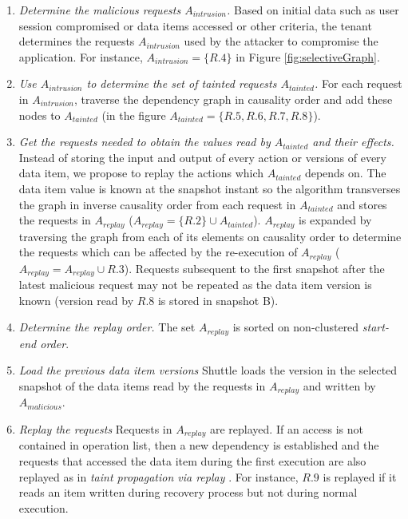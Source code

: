 \begin{enumerate}
\item \textit{Determine the malicious requests $A_{intrusion}$.}
Based on initial data such as user session compromised or data items accessed or other criteria, the tenant determines the requests $A_{intrusion}$ used by the attacker to compromise the application. For instance, $A_{intrusion} = \{R.4\} $ in Figure \ref{fig:selectiveGraph}.

\item \textit{Use $A_{intrusion}$ to determine the set of tainted requests $A_{tainted}$.}
For each request in $A_{intrusion}$, traverse the dependency graph in causality order and add these nodes to $A_{tainted}$ (in the figure $A_{tainted} = \{R.5,R.6,R.7,R.8\}$).


\item \textit{Get the requests needed to obtain the values read by $A_{tainted}$ and their effects.} 
Instead of storing the input and output of every action or versions of every data item, we propose to replay the actions which $A_{tainted}$ depends on. The data item value is known at the snapshot instant so the algorithm transverses the graph in inverse causality order from each request in $A_{tainted}$ and stores the requests in $A_{replay}$ ($A_{replay} = \{R.2\} \cup A_{tainted}$). $A_{replay}$ is expanded by traversing the graph from each of its elements on causality order to determine the requests which can be affected by the re-execution of $A_{replay}$ ($A_{replay} = A_{replay} \cup R.3$). Requests subsequent to the first snapshot after the latest malicious request may not be repeated as the data item version is known (version read by $R.8$ is stored in snapshot B).

\item \textit{Determine the replay order.} 
The set $A_{replay}$ is sorted on non-clustered \emph{start-end order}.

\item \textit{Load the previous data item versions}
Shuttle loads the version in the selected snapshot of the data items read by the requests in $A_{replay}$ and written by $A_{malicious}$.

\item \textit{Replay the requests}
Requests in $A_{replay}$ are replayed. If an access is not contained in operation list, then a new dependency is established and the requests that accessed the data item during the first execution are also replayed as in \emph{taint propagation via replay} \cite{retro}. For instance, $R.9$ is replayed if it reads an item written during recovery process but not during normal execution. 
\end{enumerate}

